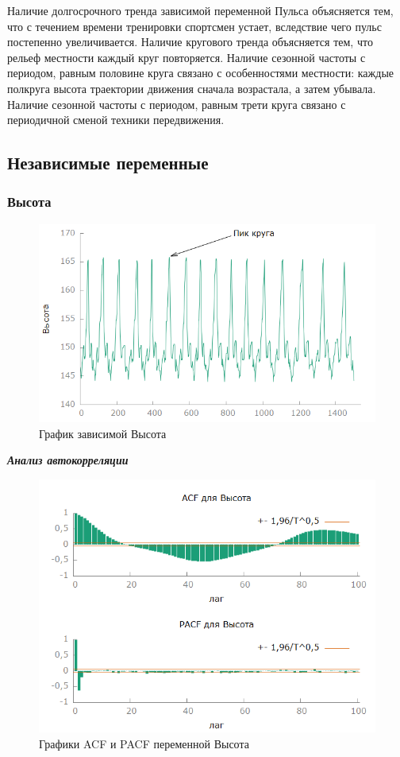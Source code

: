 \documentclass[a4paper,12pt]{article}
\begin{document}
Наличие долгосрочного тренда зависимой переменной Пульса объясняется тем, что с течением времени тренировки спортсмен устает, вследствие чего пульс постепенно увеличивается. Наличие кругового тренда объясняется тем, что рельеф местности каждый круг повторяется. Наличие сезонной частоты с периодом, равным половине круга связано с особенностями местности: каждые полкруга высота траектории движения сначала возрастала, а затем убывала. Наличие сезонной частоты с периодом, равным трети круга связано с периодичной сменой техники передвижения. %

\subsection{Независимые переменные}
\subsubsection{Высота}
\begin{figure}[H]
	\centering
	\includegraphics[width=0.7\linewidth]{../[graphics]/ele_graph}
	\caption{График зависимой Высота}
	\label{fig:ele_graph}
\end{figure}

\textbf{\textit{Анализ автокорреляции}}

\begin{figure}[H]
	\centering
	\includegraphics[width=0.7\linewidth]{../[graphics]/ele_acf_100}
	\caption{Графики ACF и PACF переменной Высота}
	\label{fig:ele_acf_100}
\end{figure}
\end{document}
